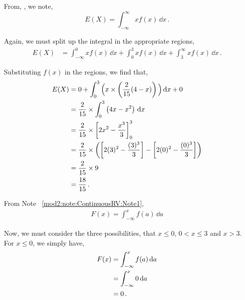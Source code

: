 \begin{subquestions}
\begin{subsubquestions}

\subsubquestion

From, , we note,
\begin{equation}
	E(X) = \int_{-\infty}^{\infty}x f(x)\,\dd x \,.
\end{equation}

Again, we must split up the integral in the appropriate regions,
\begin{align}
	E(X) &= 	\int_{-\infty}^{0}x f(x)\,\dd x +  \int_{0}^{3}x f(x)\,\dd x + \int_{3}^{\infty}x f(x)\,\dd x \,.
\end{align}

Substituting $f(x)$ in the regions, we find that,
\begin{align}
	E(X) & = 0+ \int_{0}^{3} \Big(x \times \left( \frac{2}{15}(4-x)\right) \Big)\,\mathrm{d} x + 0\nonumber \\
	                                        & = \frac{2}{15} \times \int_0^3 \left(4x-x^2 \right)\,\mathrm{d} x \nonumber \\
	                                        & = \frac{2}{15} \times \left[ 2x^2 - \frac{x^3}{3} \right]_0^3 \nonumber \\
	                                        & = \frac{2}{15} \times \left( \left[ 2(3)^2 - \frac{(3)^3}{3} \right] - \left[ 2(0)^2 - \frac{(0)^3}{3} \right] \right) \nonumber \\
	                                        & = \frac{2}{15} \times 9 \nonumber \\
	                                        & = \frac{18}{15} \,.
\end{align}


\subsubquestion

From Note ~\ref{mod2:note:ContinuousRV:Note1},
\begin{align}
	F(x) = \int_{-\infty}^{x} f(a)\,\dd a
\end{align}

Now, we must consider the three possibilities, that $x\leq0$, $0 < x \leq 3$ and $x>3$.
For $x\leq 0$, we simply have,
\begin{align}
	F(x) &= \int_{-\infty}^{x} f(a)\,\mathrm{d} a \nonumber\\
		&= \int_{-\infty}^x0 \,\mathrm{d} a \nonumber\\
		&= 0\,.
\end{align}


\end{subsubquestions}
\end{subquestions}
